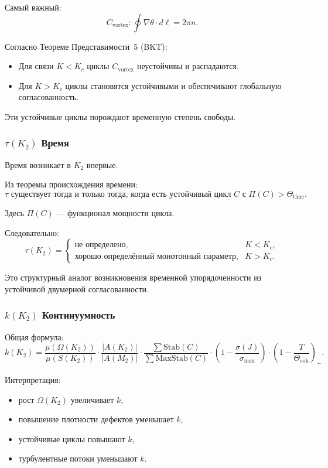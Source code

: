 Самый важный:
\[
C_{\mathrm{vortex}}: \oint \nabla \theta \cdot d\ell = 2\pi n.
\]

Согласно Теореме Представимости~5 (BKT):
\begin{itemize}
    \item Для связи $K < K_c$ циклы $C_{\mathrm{vortex}}$ неустойчивы и
          распадаются.
    \item Для $K > K_c$ циклы становятся устойчивыми и обеспечивают
          глобальную согласованность.
\end{itemize}

Эти устойчивые циклы порождают временную степень свободы.

\subsubsection{\texorpdfstring{$\tau(K_2)$}{\tau(K_2)} Время}

Время возникает в $K_2$ впервые.

Из теоремы происхождения времени:
\[
\tau \text{ существует тогда и только тогда, когда есть устойчивый цикл }
C \text{ с } \Pi(C) > \Theta_{\mathrm{time}}.
\]

Здесь $\Pi(C)$ — функционал мощности цикла.

Следовательно:
\[
\tau(K_2) =
\begin{cases}
\text{не определено}, & K < K_c, \\
\text{хорошо определённый монотонный параметр}, & K > K_c.
\end{cases}
\]

Это структурный аналог возникновения временной упорядоченности из
устойчивой двумерной согласованности.

\subsubsection{\texorpdfstring{$k(K_2)$}{k(K_2)} Континуумность}

Общая формула:
\[
k(K_2) =
\frac{\mu(\Omega(K_2))}{\mu(S(K_2))}
\cdot
\frac{|A(K_2)|}{|A(M_2)|}
\cdot
\frac{\sum \mathrm{Stab}(C)}{\sum \mathrm{MaxStab}(C)}
\cdot
\left(1 - \frac{\sigma(J)}{\sigma_{\max}}\right)
\cdot
\left(1 - \frac{T}{\Theta_{\mathrm{coh}}}\right)_+.
\]

Интерпретация:
\begin{itemize}
    \item рост $\Omega(K_2)$ увеличивает $k$,
    \item повышение плотности дефектов уменьшает $k$,
    \item устойчивые циклы повышают $k$,
    \item турбулентные потоки уменьшают $k$.
\end{itemize}

